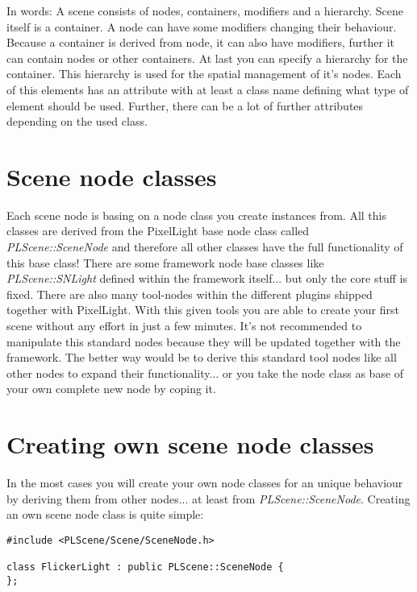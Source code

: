 In words: A scene consists of nodes, containers, modifiers and a hierarchy. Scene itself is a container. A node can have some modifiers changing their behaviour. Because a container is derived from node, it can also have modifiers, further it can contain nodes or other containers. At last you can specify a hierarchy for the container. This hierarchy is used for the spatial management of it's nodes. Each of this elements has an attribute with at least a class name defining what type of element should be used. Further, there can be a lot of further attributes depending on the used class.




\section{Scene node classes}
Each scene node is basing on a node class you create instances from. All this classes are derived from the PixelLight base node class called \emph{PLScene::SceneNode} and therefore all other classes have the full functionality of this base class! There are some framework node base classes like \emph{PLScene::SNLight} defined within the framework itself... but only the core stuff is fixed. There are also many tool-nodes within the different plugins shipped together with PixelLight. With this given tools you are able to create your first scene without any effort in just a few minutes. It's not recommended to manipulate this standard nodes because they will be updated together with the framework. The better way would be to derive this standard tool nodes like all other nodes to expand their functionality... or you take the node class as base of your own complete new node by coping it.




\section{Creating own scene node classes}
In the most cases you will create your own node classes for an unique behaviour by deriving them from other nodes... at least from \emph{PLScene::SceneNode}. Creating an own scene node class is quite simple:

\begin{lstlisting}[caption=Creating a new own scene node class]
#include <PLScene/Scene/SceneNode.h>

class FlickerLight : public PLScene::SceneNode {
};
\end{lstlisting}

